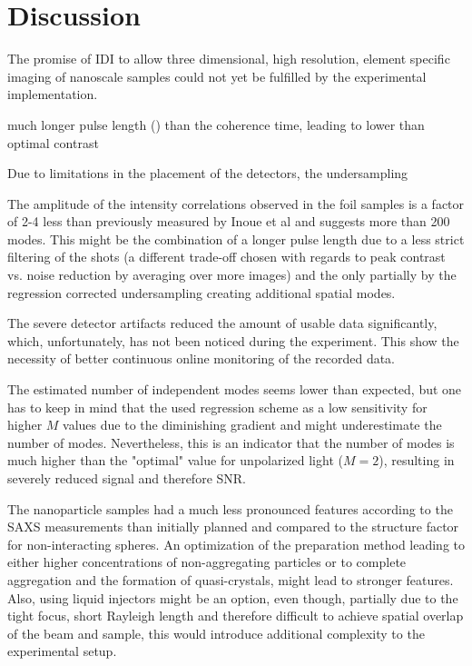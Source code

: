 \chapter{Discussion}
The promise of IDI to allow three dimensional, high resolution, element specific imaging of nanoscale samples could not yet be fulfilled by the experimental implementation.

 
much longer pulse length () than the coherence time, leading to lower than optimal contrast

Due to limitations in the placement of the detectors, the undersampling

The amplitude of the intensity correlations observed in the foil samples is a factor of 2-4 less than previously measured by Inoue et al and suggests more than 200 modes. This might be the combination of a longer pulse length due to a less strict filtering of the shots (a different trade-off chosen with regards to peak contrast vs. noise reduction by averaging over more images) and the only partially by the regression corrected undersampling creating additional spatial modes.

The severe detector artifacts reduced the amount of usable data significantly, which, unfortunately, has not been noticed during the experiment. This show the necessity of better continuous online monitoring of the recorded data.




The estimated number of independent modes seems lower than expected, but one has to keep in mind that the used regression scheme as a low sensitivity for higher $M$ values due to the diminishing gradient and might underestimate the number of modes. Nevertheless, this is an indicator that the number of modes is much higher than the "optimal" value for unpolarized light ($M=2$), resulting in severely reduced signal and therefore SNR.

The nanoparticle samples had a much less pronounced features according to the SAXS measurements than initially planned and compared to the structure factor for non-interacting spheres. An optimization of the preparation method leading to either higher concentrations of non-aggregating particles or to complete aggregation and the  formation of quasi-crystals, might lead to stronger features. Also, using liquid injectors might be an option, even though, partially due to the tight focus, short Rayleigh length and therefore difficult to achieve spatial overlap of the beam and sample, this would introduce additional complexity to the experimental setup.



